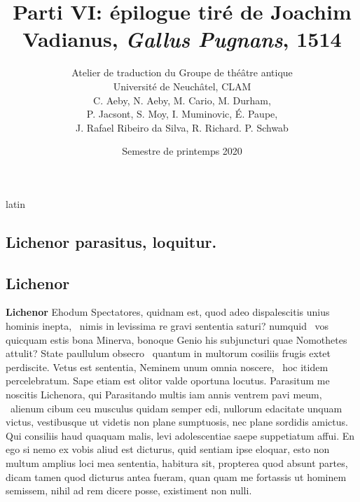 \documentclass[12pt]{book}
\renewenvironment{latin}
    	{\begin{hyphenrules}{latin}}
    	{\end{hyphenrules}}
\begin{document}
        \title{Parti VI: épilogue tiré de Joachim Vadianus, \textit{Gallus Pugnans}, 1514}
        \author{Atelier de traduction du Groupe de théâtre antique\\
            Université de Neuchâtel, CLAM\\
            C. Aeby, N. Aeby, M. Cario, M. Durham,\\ 
            P. Jacsont, S. Moy, I. Muminovic, É. Paupe,\\
            J. Rafael Ribeiro da Silva, R. Richard. P. Schwab}
        \date{Semestre de printemps 2020}
        
        \maketitle
        \begin{pages}
        \begin{latin}
        \begin{Leftside}
        \beginnumbering 
            \pstart\section*{Lichenor parasitus, loquitur.}\pend\pstart\subsection*{Lichenor}\pend\pstart\textbf{Lichenor}\hspace{1cm} 
                    Ehodum Spectatores, quidnam est, quod adeo dispalescitis unius hominis inepta, ﻿\ampersand\ nimis in levissima re gravi sententia saturi? 
                    numquid ﻿\ampersand\ vos quicquam estis bona Minerva, bonoque Genio his subjuncturi quae Nomothetes attulit? 
                    State paullulum   obsecro ﻿\ampersand\ quantum in multorum cosiliis frugis extet perdiscite. 
                    Vetus est sententia, Neminem unum omnia noscere, ﻿\ampersand\ hoc itidem percelebratum. 
                    Sape etiam est olitor valde oportuna locutus. 
                    Parasitum me noscitis Lichenora, qui Parasitando multis iam annis ventrem pavi meum, ﻿\ampersand\ alienum cibum ceu musculus quidam semper edi, nullorum edacitate unquam victus, vestibusque ut videtis non plane sumptuosis, nec plane sordidis amictus. 
                    Qui consiliis haud quaquam malis, levi adolescentiae saepe suppetiatum affui. 
                    En ego si nemo ex vobis aliud est dicturus, quid sentiam ipse eloquar, esto non multum amplius loci mea sententia, habitura sit, propterea quod absunt partes, dicam tamen quod dicturus antea fueram, quan quam me fortassis ut hominem semissem, nihil ad rem dicere posse, existiment non nulli. 

\end{Leftside}
\end{latin}
\end{pages}
\end{document}
